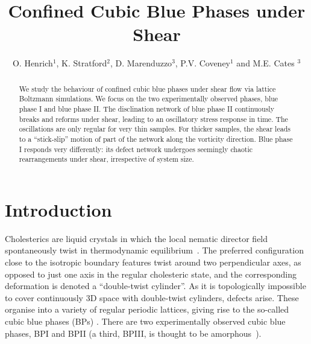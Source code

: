 \documentclass[12pt,twoside]{iopart}
\begin{document}
\title[]{Confined Cubic Blue Phases under Shear}
\author{O. Henrich$^{1}$, K. Stratford$^2$, D. Marenduzzo$^3$, P.V. Coveney$^1$ and M.E. Cates $^3$}

\address{$^1$ Centre for Computational Science, Department of Chemistry,
University College London, WC1H 0AJ, United Kingdom\\
$^2$ Edinburgh Parallel Computing Centre and
$^3$ School of Physics and Astronomy, The King's Buildings,
The University of Edinburgh, EH9 3JZ, United Kingdom}

\begin{abstract}
We study the behaviour of confined cubic blue phases under shear flow
via lattice Boltzmann simulations. We focus on the two experimentally observed
phases, blue phase I and blue phase II. The disclination network of blue phase II continuously breaks and reforms under shear, 
leading to an oscillatory stress response in time. The oscillations are only regular for very thin samples. For thicker samples, the shear leads to a ``stick-slip'' motion
of part of the network along the vorticity direction.
Blue phase I responds very differently: its defect network undergoes seemingly
chaotic rearrangements under shear, irrespective of system size. 
\end{abstract}


\section{Introduction}
Cholesterics are liquid crystals in which the local nematic director field spontaneously twist in thermodynamic equilibrium~\cite{deGennes}.
The preferred configuration close to the isotropic boundary features twist around two perpendicular axes, as opposed to just one axis in the regular cholesteric state, and the corresponding deformation is denoted a ``double-twist cylinder''.
As it is topologically impossible to cover continuously 3D space with double-twist cylinders, defects arise. These organise into a variety of regular periodic lattices, giving rise to the so-called cubic blue phases (BPs) \cite{Grebel:1984,Wright:1989}. There are two experimentally observed cubic blue phases, BPI and BPII (a third, BPIII, is thought to be amorphous~\cite{Henrich:2011a}).
\end{document}
